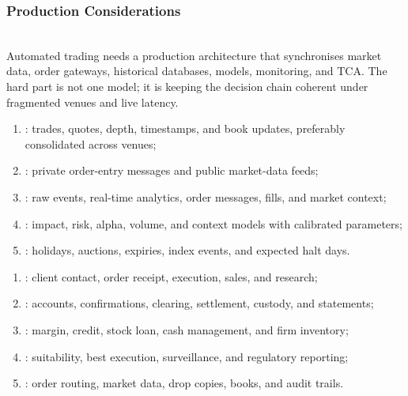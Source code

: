 \subsubsection{Production Considerations}

\begin{principle} \\
Automated trading needs a production architecture that synchronises market data, order gateways, historical databases, models, monitoring, and TCA. The hard part is not one model; it is keeping the decision chain coherent under fragmented venues and live latency.
\end{principle}

\begin{taxonomy} 
\begin{enumerate}[label=\roman*.]
\setlength{\itemsep}{0pt}
\item {}: trades, quotes, depth, timestamps, and book updates, preferably consolidated across venues;
\item {}: private order-entry messages and public market-data feeds;
\item {}: raw events, real-time analytics, order messages, fills, and market context;
\item {}: impact, risk, alpha, volume, and context models with calibrated parameters;
\item {}: holidays, auctions, expiries, index events, and expected halt days.
\end{enumerate}
\end{taxonomy}

\begin{taxonomy} 
\begin{enumerate}[label=\roman*.]
\setlength{\itemsep}{0pt}
\item {}: client contact, order receipt, execution, sales, and research;
\item {}: accounts, confirmations, clearing, settlement, custody, and statements;
\item {}: margin, credit, stock loan, cash management, and firm inventory;
\item {}: suitability, best execution, surveillance, and regulatory reporting;
\item {}: order routing, market data, drop copies, books, and audit trails.
\end{enumerate}
\end{taxonomy}


